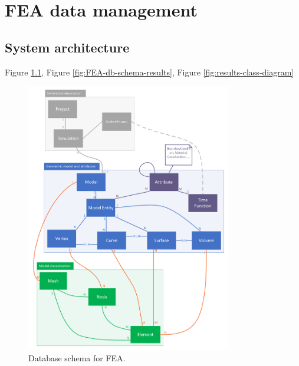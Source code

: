 \chapter{FEA data management}
\label{chapter:data-management}



\section{System architecture}
\label{sec:system-architecture}


Figure \ref{fig:FEA-db-schema}, Figure \ref{fig:FEA-db-schema-results}, Figure \ref{fig:results-class-diagram}

\begin{figure}[H]
    \centering
    \includegraphics[width=0.8\textwidth]{figures/FEA-database-schema}
    \decoRule
    \caption{Database schema for FEA.}
    \label{fig:FEA-db-schema}
\end{figure}

